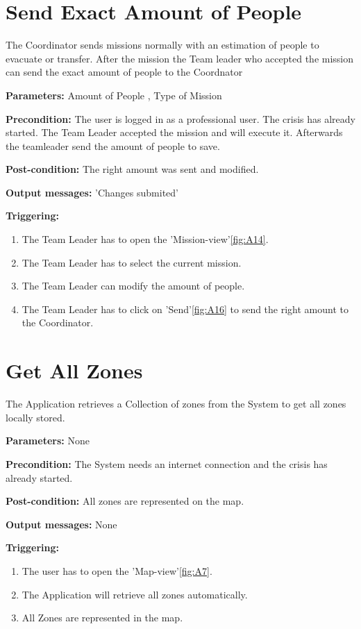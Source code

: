 \section{Send Exact Amount of People}
\label{operation:ExactAmount}
The Coordinator sends missions normally with an estimation of people to
evacuate or transfer. After the mission the Team leader who accepted the
mission can send the exact amount of people to the Coordnator\\
\begin{description}
\item \textbf{Parameters:} Amount of People , Type of Mission
\item \textbf{Precondition:} The user is logged in as a professional user. The
crisis has already started. The Team Leader accepted the mission and will
execute it. Afterwards the teamleader send the amount of people to save.
\item \textbf{Post-condition:} The right amount was sent and modified.
\item \textbf{Output messages:} 'Changes submited'
\item \textbf{Triggering:}
\begin{enumerate}
\item The Team Leader has to open the 'Mission-view'\ref{fig:A14}.
\item The Team Leader has to select the current mission.
\item The Team Leader can modify the amount of people.
\item The Team Leader has to click on 'Send'\ref{fig:A16} to send the right
amount to the Coordinator.
\end{enumerate}
\end{description}   

\section{Get All Zones}
\label{operation:Get All Zones}
The Application retrieves a Collection of zones from the System to get all zones
locally stored.
\begin{description}
\item \textbf{Parameters:} None
\item \textbf{Precondition:} The System needs an internet connection and the
crisis has already started.
\item \textbf{Post-condition:} All zones are represented on the map.
\item \textbf{Output messages:} None
\item \textbf{Triggering:}
\begin{enumerate}
\item The user has to open the 'Map-view'\ref{fig:A7}.
\item The Application will retrieve all zones automatically.
\item All Zones are represented in the map.
\end{enumerate}
\end{description}  

